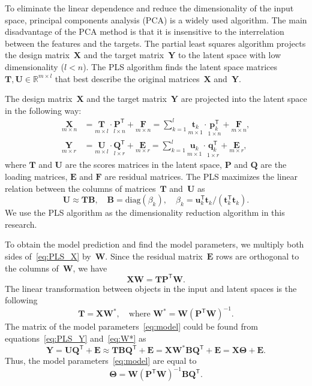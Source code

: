 \documentclass[preprint,12pt]{elsarticle}
\theoremstyle{definition}
\newcommand{\bY}{\mathbf{Y}}
\newcommand{\bX}{\mathbf{X}}
\newcommand{\bu}{\mathbf{u}}
\newcommand{\bt}{\mathbf{t}}
\newcommand{\bp}{\mathbf{p}}
\newcommand{\bq}{\mathbf{q}}
\newcommand{\bP}{\mathbf{P}}
\newcommand{\bT}{\mathbf{T}}
\newcommand{\bB}{\mathbf{B}}
\newcommand{\bQ}{\mathbf{Q}}
\newcommand{\bE}{\mathbf{E}}
\newcommand{\bF}{\mathbf{F}}
\newcommand{\bU}{\mathbf{U}}
\newcommand{\bW}{\mathbf{W}}
\newcommand{\T}{\mathsf{T}}
\newcommand{\bTheta}{\boldsymbol{\Theta}}
\begin{document}
To eliminate the linear dependence and reduce the dimensionality of the input space, principal components analysis (PCA) is a widely used algorithm. 
The main disadvantage of the PCA method is that it is insensitive to the interrelation between the features and the targets.
The partial least squares algorithm projects the design matrix~$\bX$ and the target matrix~$\bY$ to the latent space with low dimensionality ($l < n$).
The PLS algorithm finds the latent space matrices $\bT, \bU \in \mathbb{R}^{m \times l}$ that best describe the original matrices~$\bX$ and~$\bY$.

The design matrix~$\bX$ and the target matrix~$\bY$ are projected into the latent space in the following way:
\begin{align}
\label{eq:PLS_X}
\underset{m \times n}{\bX} 
&= \underset{m \times l}{\bT} \cdot \underset{l \times n}{\bP^{\T}} + \underset{m \times n}{\bF} 
= \sum_{k=1}^l \underset{m \times 1}{\bt_k} \cdot \underset{1 \times n}{\bp_k^{\T}} + \underset{m \times n}{\bF},\\
\label{eq:PLS_Y}
\underset{m \times r}{\bY} 
&= \underset{m \times l}{\bU} \cdot \underset{l \times r}{\bQ^{\T}} + \underset{m \times r}{\bE}
=  \sum_{k=1}^l  \underset{m \times 1}{\bu_k} \cdot \underset{1 \times r}{\bq_k^{\T}} +  \underset{m \times r}{\bE},
\end{align}
where $\bT$ and $\bU$ are the scores matrices in the latent space, $\bP$ and $\bQ$ are the loading matrices, $\bE$ and $\bF$ are residual matrices. The PLS maximizes the linear relation between the columns of matrices~$\bT$ and~$\bU$ as
\begin{equation*}
\bU \approx \bT \bB, \quad \bB = \text{diag}(\beta_k), \quad \beta_k = \bu_k^{\T}\bt_k / (\bt_k^{\T}\bt_k).
\end{equation*}
We use the PLS algorithm as the dimensionality reduction algorithm in this research.

To obtain the model prediction and find the model parameters, we multiply both sides of~\eqref{eq:PLS_X} by~$\bW$. 
Since the residual matrix~$\bE$ rows are orthogonal to the columns of~$\bW$, we have
\begin{equation*}
\bX \bW = \bT \bP^{\T} \bW.
\end{equation*}
The linear transformation between objects in the input and latent spaces is the following
\begin{equation}
\bT = \bX \bW^*, \quad \text{where } \bW^* = \bW (\bP^{\T} \bW)^{-1}.
\label{eq:W*}
\end{equation}
The matrix of the model parameters~\eqref{eq:model} could be found from equations~\eqref{eq:PLS_Y} and~\eqref{eq:W*} as
\begin{equation}
\bY = \bU \bQ^{\T} + \bE \approx \bT \bB \bQ^{\T}+ \bE = \bX \bW^* \bB \bQ^{\T} + \bE = \bX \bTheta + \bE.
\label{eq:pls_model}
\end{equation}
Thus, the model parameters~\eqref{eq:model} are equal to
\begin{equation*}
\bTheta = \bW (\bP^{\T} \bW)^{-1} \bB \bQ^{\T}.
\end{equation*}
\end{document}
